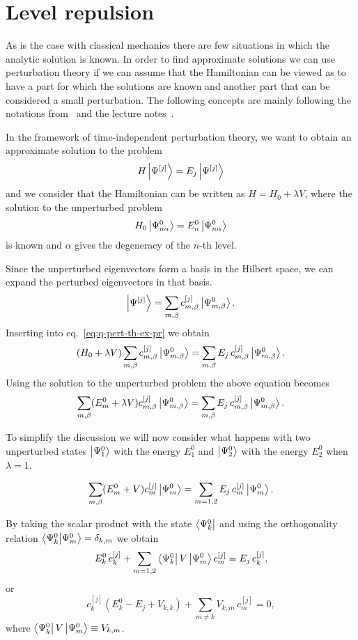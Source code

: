 \documentclass[../thesis.tex]{subfiles}
\theoremstyle{definition}
\begin{document}
\section{Level repulsion}

As is the case with classical mechanics there are few situations in which the
analytic solution is known. In order to find approximate solutions we can use
perturbation theory if we can assume that the Hamiltonian can be viewed as to
have a part for which the solutions are known and another part that can
be considered a small perturbation. The following concepts are mainly following
the notations from~\cite{Sakurai2011} and the lecture notes~\cite{Baran,Zus}.

In the framework of time-independent perturbation theory, we want to obtain
an approximate solution to the problem
\begin{equation}
  H \ket{\Psi^{[j]}} = E_j \ket{\Psi^{[j]}}
\label{eq:q-pert-th-ex-pr}
\end{equation}
and we consider that the Hamiltonian can be written as \(H = H_0 + \lambda V\),
where the solution to the unperturbed problem
\[
  H_0 \ket{\Psi^0_{n\alpha}} = E_n^0 \ket{\Psi^0_{n\alpha}}
\]
is known and \( \alpha \) gives the degeneracy of the \(n\)-th level.

Since the unperturbed eigenvectors form a basis in the Hilbert space, we can
expand the perturbed eigenvectors in that basis.
\[
  \ket{\Psi^{[j]}} = \sum_{m,\beta} c_{m,\beta}^{[j]} \ket{\Psi_{m,\beta}^0}.
\]
Inserting into eq.~\eqref{eq:q-pert-th-ex-pr} we obtain
\[
  (H_0 + \lambda V) \sum_{m,\beta} c_{m,\beta}^{[j]} \ket{\Psi_{m,\beta}^0}
  = \sum_{m,\beta} E_j\, c_{m,\beta}^{[j]} \ket{\Psi_{m,\beta}^0}.
\]
Using the solution to the unperturbed problem the above equation becomes
\[
\sum_{m,\beta} (E_m^0 + \lambda V)  c_{m,\beta}^{[j]} \ket{\Psi_{m,\beta}^0}
= \sum_{m,\beta} E_j\, c_{m,\beta}^{[j]} \ket{\Psi_{m,\beta}^0}.
\]

To simplify the discussion we will now consider what happens with two unperturbed
states \(\ket{\Psi_1^0}\) with the energy \(E_1^0\) and \(\ket{\Psi_2^0}\) with
the energy \(E_2^0\) when \(\lambda=1\).

\[
\sum_{m,\beta} (E_m^0 + V)  c_{m}^{[j]} \ket{\Psi_{m}^0}
= \sum_{m=1,2} E_j\, c_{m}^{[j]} \ket{\Psi_{m}^0}
.\]

By taking the scalar product with the state \(\bra{\Psi_{k}^0}\) and using the
orthogonality relation
\(\braket{\Psi_{k}^0}{\Psi_{m}^0} = \delta_{k,m}\)
we obtain
\[
E_k^0\, c_{k}^{[j]} + \sum_{m=1,2} \bra{\Psi_{k}^0} V \ket{\Psi_{m}^0} c_{m}^{[j]}
= E_j\, c_{k}^{[j]},
\]
or
\[
  c_{k}^{[j]} \left( E_k^0 - E_j + V_{k,k} \right) + \sum_{m \neq k} V_{k,m}\, c_{m}^{[j]} = 0,
\]
where \(\bra{\Psi_{k}^0} V \ket{\Psi_{m}^0} \equiv V_{k,m}\).
\end{document}
